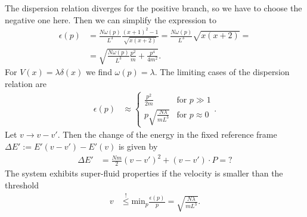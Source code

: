 \documentclass[english, parskip=full]{scrartcl}
\newcommand{\tecxt}{}
\begin{document}
The dispersion relation diverges for the positive branch, so we have to choose the negative one here.
Then we can simplify the expression to
\begin{align}
\epsilon (p)&=\frac{N\omega (p)}{L^3}\frac{(x+1)^2-1}{\sqrt{x(x+2)}}=\frac{N\omega (p)}{L^3}\sqrt{x(x+2)}=\\
&=\sqrt{\frac{N\omega (p)}{L^3}\frac{p^2}{m}+\frac{p^4}{4m^2}}.
\end{align}
For $V(x)=\lambda\delta (x)$ we find $\omega (p)=\lambda $.
The limiting cases of the dispersion relation are
\begin{align}
\epsilon (p)&\approx\begin{cases}\frac{p^2}{2m}&\tecxt\text{for\ } p\gg 1 \\
p\sqrt{\frac{N\lambda}{mL^3}} & \tecxt\text{for\ } p\approx 0
\end{cases}.
\end{align}
Let $v\rightarrow v-v'$. 
Then the change of the energy in the fixed reference frame $\Delta E':=E'(v-v')-E'(v)$ is given by
\begin{align}
\Delta E'&=\frac{Nm}{2}(v-v')^2+(v-v')\cdot P=?
\end{align}
The system exhibits super-fluid properties if the velocity is smaller than the threshold
\begin{align}
v&\overset{!}{\le}\tecxt\text{min}_p\frac{\epsilon (p)}{p}=\sqrt{\frac{N\lambda}{mL^3}}.
\end{align}
\end{document}
